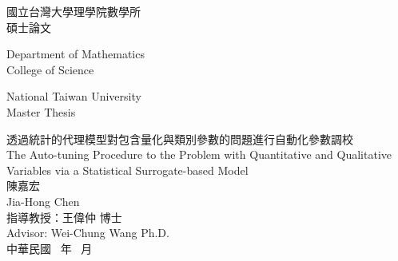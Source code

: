 \documentclass[Thesis.tex]{subfiles}
\begin{document}
\begin{CJK}{UTF8}{bkai}

\begin{titlepage}
  \begin{center}
     
    \vspace*{1cm}
    \begin{Large}
      國立台灣大學理學院數學所\\
      碩士論文\\
    \end{Large}
    \vspace{0.5cm}
    \begin{large}
      Department of Mathematics\\
      College of Science\\
    \end{large}
    \vspace{0.5cm}
    \begin{Large}
      National Taiwan University\\
      Master Thesis\\
    \end{Large}
    \vspace{2cm}
    \begin{Large}
      透過統計的代理模型對包含量化與類別參數的問題進行自動化參數調校\\
      \vspace{0.5cm}
      The Auto-tuning Procedure to the Problem with Quantitative and Qualitative Variables 
      via a Statistical Surrogate-based Model\\
      \vspace{1.5cm}
      陳嘉宏\\
      Jia-Hong Chen\\
      \vspace{1.5cm}
      指導教授：王偉仲 博士\\
      Advisor: Wei-Chung Wang Ph.D.\\
      \vspace{1.5cm}
      中華民國 \thechineseyear \ 年 \number\month \ 月\\
      \monthname\ \number\year\

    \end{Large}
    
  \end{center}
\end{titlepage}


\end{CJK}
\end{document}
